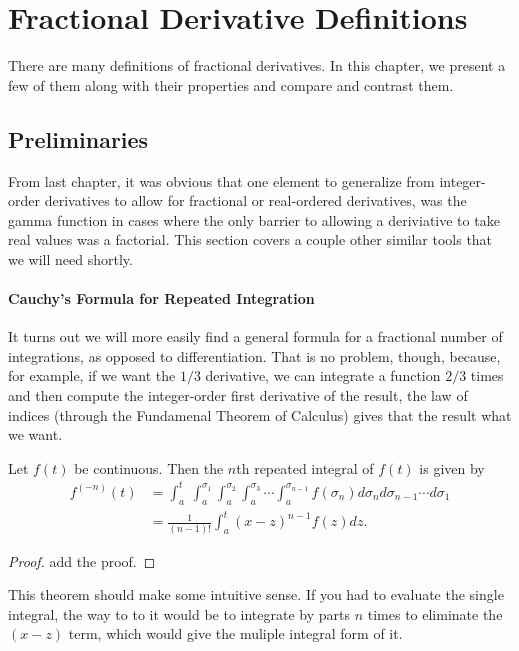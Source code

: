 \chapter{Fractional Derivative Definitions}

There are many definitions of fractional derivatives. In this chapter, we present a few of them along with their properties and compare and contrast them.

\section{Preliminaries}

From last chapter, it was obvious that one element to generalize from integer-order derivatives to allow for fractional or real-ordered derivatives, was the gamma function in cases where the only barrier to allowing a deriviative to take real values was a factorial. This section covers a couple other similar tools that we will need shortly.

\subsubsection{Cauchy's Formula for Repeated Integration}

It turns out we will more easily find a general formula for a fractional number of integrations, as opposed to differentiation. That is no problem, though, because, for example, if we want the $1/3$ derivative, we can integrate a function $2/3$ times and then compute the integer-order first derivative of the result, the law of indices (through the Fundamenal Theorem of Calculus) gives that the result what we want. 

\begin{theorem}
  Let $f(t)$ be continuous. Then the $n$th repeated integral of $f(t)$ is given by
  \begin{align}
   f^{(-n)}(t) &= \int_a^{t}  \ \int_a^{\sigma_1}  \int_a^{\sigma_2}  \int_a^{\sigma_3} \cdots \int_a^{\sigma_{n-1}} f(\sigma_n) d \sigma_n d \sigma_{n-1} \cdots d \sigma_1 \nonumber  \\
   &= \frac{1}{\left( n - 1 \right)!} \int_a^t \left( x - z \right)^{n-1} f(z) dz.
    \label{eq:cauchy}
  \end{align}
 \label{th:cauchy}
\end{theorem}
\begin{proof}
add the proof.
\end{proof}

This theorem should make some intuitive sense. If you had to evaluate the single integral, the way to to it would be to integrate by parts $n$ times to eliminate the $(x - z)$ term, which would give the muliple integral form of it.


